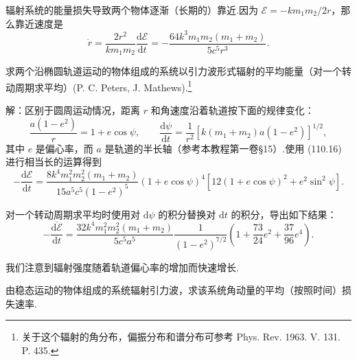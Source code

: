 \begin{xiti}
辐射系统的能量损失导致两个物体逐渐（长期的）靠近.因为 $\mathcal{E}=-km_1m_2/2r$，那么靠近速度是
\begin{equation*}
  \dot{r}=\frac{2r^{2}}{km_1m_2}\frac{\mathrm{d}\mathcal{E}}{\mathrm{d}t}
  =-\frac{64k^{3}m_1m_2(m_1+m_2)}{5c^{5}r^{3}}.
\end{equation*}

\quad 求两个沿椭圆轨道运动的物体组成的系统以引力波形式辐射的平均能量（对一个转动周期求平均）(P. C. Peters, J. Mathews).\footnote{关于这个辐射的角分布，偏振分布和谱分布可参考 Phys. Rev. 1963. V. 131. P. 435.}

解：区别于圆周运动情况，距离 $r$ 和角速度沿着轨道按下面的规律变化：
\begin{equation*}
  \frac{a(1-e^{2})}{r}=1+e\cos\psi,
  \qquad
  \frac{\mathrm{d}\psi}{\mathrm{d}t}
  =\frac{1}{r^{2}}\left[k(m_1+m_2)a(1-e^{2})\right]^{1/2},
\end{equation*}
其中 $e$ 是偏心率，而 $a$ 是轨道的半长轴（参考本教程第一卷§15）.使用 (110.16) 进行相当长的运算得到
\begin{equation*}
  -\frac{\mathrm{d}\mathcal{E}}{\mathrm{d}t}
  =\frac{8k^{4}m_1^{2}m_2^{2}(m_1+m_2)}
  {15a^{5}c^{5}(1-e^{2})^{5}}
  (1+e\cos\psi)^{4}
  \left[12(1+e\cos\psi)^{2}+e^{2}\sin^{2}\psi\right].
\end{equation*}

对一个转动周期求平均时使用对 $\mathrm{d}\psi$ 的积分替换对 $\mathrm{d}t$ 的积分，导出如下结果：
\begin{equation*}
  -\frac{\overline{\mathrm{d}\mathcal{E}}}{\mathrm{d}t}
  =\frac{32k^{4}m_1^{2}m_2^{2}(m_1+m_2)}{5c^{5}a^{5}}
  \frac{1}{(1-e^{2})^{7/2}}
  \left(1+\frac{73}{24}e^{2}+\frac{37}{96}e^{4}\right).
\end{equation*}

我们注意到辐射强度随着轨道偏心率的增加而快速增长.

\quad 由稳态运动的物体组成的系统辐射引力波，求该系统角动量的平均（按照时间）损失速率.


\end{xiti}
